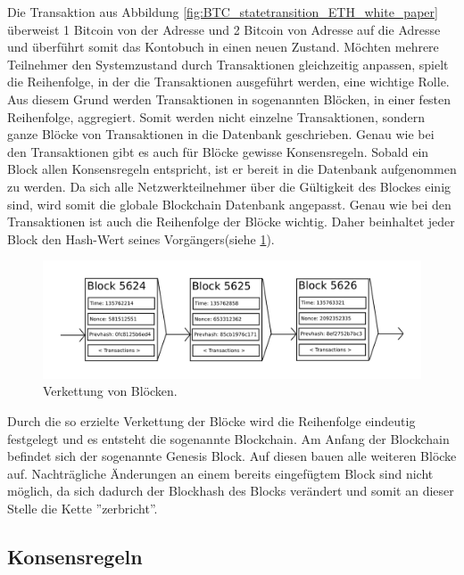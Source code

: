Die Transaktion aus Abbildung \ref{fig:BTC_statetransition_ETH_white_paper} überweist 1 Bitcoin von der Adresse  und 2 Bitcoin von Adresse  auf die Adresse  und überführt somit das Kontobuch in einen neuen Zustand. Möchten mehrere Teilnehmer den Systemzustand durch Transaktionen gleichzeitig anpassen, spielt die Reihenfolge, in der die Transaktionen ausgeführt werden, eine wichtige Rolle. Aus diesem Grund werden Transaktionen in sogenannten Blöcken, in einer festen Reihenfolge, aggregiert. Somit werden nicht einzelne Transaktionen, sondern ganze Blöcke von Transaktionen in die Datenbank geschrieben. Genau wie bei den Transaktionen gibt es auch für Blöcke gewisse Konsensregeln. Sobald ein Block allen Konsensregeln entspricht, ist er bereit in die Datenbank aufgenommen zu werden.
Da sich alle Netzwerkteilnehmer über die Gültigkeit des Blockes einig sind, wird somit die globale Blockchain Datenbank angepasst. Genau wie bei den Transaktionen ist auch die Reihenfolge der Blöcke wichtig. Daher beinhaltet jeder Block den Hash-Wert seines Vorgängers(siehe \ref{fig:blockchain_ETH_white_paper}).

\begin{figure}[H]
\centering
\includegraphics[width=1\linewidth]{Figures/blockchain_ETH_white_paper}
\decoRule
\caption[Kette von Blöcken]{Verkettung von Blöcken.}
\label{fig:blockchain_ETH_white_paper}
\end{figure}

Durch die so erzielte Verkettung der Blöcke wird die Reihenfolge eindeutig festgelegt und es entsteht die sogenannte Blockchain. Am Anfang der Blockchain befindet sich der sogenannte Genesis Block. Auf diesen bauen alle weiteren Blöcke auf. Nachträgliche Änderungen an einem bereits eingefügtem Block sind nicht möglich, da sich dadurch der Blockhash des Blocks verändert und somit an dieser Stelle die Kette ''zerbricht''.

\subsection{Konsensregeln}

